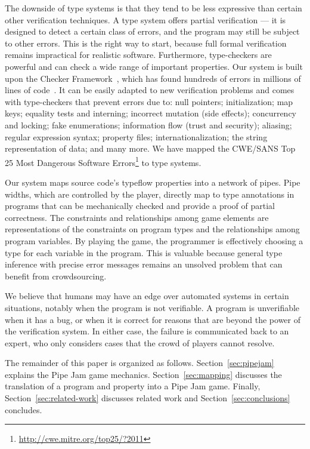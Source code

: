 \documentclass{sig-alternate}
\newcommand{\secref}[1]{Section~\ref{#1}}
\begin{document}
The downside of type systems is that they tend to be less expressive than
certain other verification techniques.
A type system offers partial verification --- it is designed to detect
a certain class of errors, and the program may still be subject to
other errors.  This is the right way to start, because full formal
verification remains impractical for realistic software.  Furthermore,
type-checkers are powerful and can check a wide range of important
properties.  Our system is built upon the Checker
Framework~\cite{checker-framework-website},
which has found hundreds of errors in millions of lines of
code~\cite{PapiACPE2008,DietlDEMS2011}.  It can be easily adapted to new
verification problems and comes
with type-checkers that prevent errors due to:  null pointers;
initialization; map keys; equality tests and interning; incorrect
mutation (side effects); concurrency and locking; fake enumerations;
information flow (trust and security); aliasing; regular expression
syntax; property files; internationalization; the string
representation of data; and many more.  We have mapped the CWE/SANS Top 25
Most Dangerous Software Errors\footnote{\url{http://cwe.mitre.org/top25/?2011}}
to type systems.

Our system maps source code's typeflow properties
into a network of pipes.
Pipe widths, which are controlled by the player, directly map to type
annotations in programs that can be mechanically checked and provide a
proof of partial correctness.
The constraints and relationships among
game elements are representations of the constraints on program types and
the relationships among program variables.
By playing the game, the programmer is effectively choosing a type for
each variable in the program.
This is valuable because general type inference with precise error messages
remains an unsolved problem that can benefit from crowdsourcing.

We believe that humans may have an edge over automated systems in
certain situations, notably when the program is not verifiable.  A
program is unverifiable when it has a bug, or when it is correct for
reasons that are beyond the power of the verification system.  In
either case, the failure is communicated back to an expert, who only
considers cases that the crowd of players cannot resolve.


\medskip

The remainder of this paper is organized as follows.
\secref{sec:pipejam} explains the Pipe Jam game mechanics.
\secref{sec:mapping} discusses the translation of a program and
property into a Pipe Jam game.
Finally, \secref{sec:related-work} discusses related
work and \secref{sec:conclusions} concludes.
\end{document}

